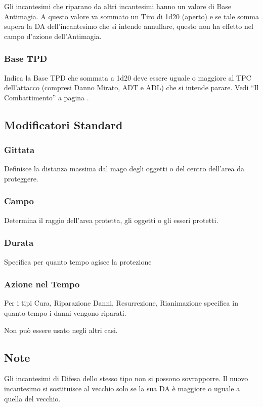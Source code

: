 Gli incantesimi che riparano da altri incantesimi hanno un valore di Base
Antimagia. A questo valore va sommato un Tiro di 1d20 (aperto) e se
tale somma supera la DA dell'incantesimo che si intende annullare,
questo non ha effetto nel campo d'azione dell'Antimagia.

\subsubsection{Base TPD}  Indica la
Base TPD che sommata a 1d20 deve essere uguale o maggiore al TPC
dell'attacco (compresi Danno Mirato, ADT e ADL) che si intende parare.
Vedi ``Il Combattimento'' a pagina \pageref{combattimento}.

\subsection{Modificatori Standard} 

\subsubsection{Gittata} 
Definisce la distanza
massima dal mago degli oggetti o del centro dell'area da proteggere.

\subsubsection{Campo} Determina il raggio dell'area protetta, gli oggetti o
gli esseri protetti. 

\subsubsection{Durata} Specifica per quanto tempo agisce
la protezione

\iffullversion
\subsubsection{Azione nel Tempo} 

Per i tipi Cura, Riparazione Danni, Resurrezione, Rianimazione
specifica in quanto tempo i danni vengono riparati.

Non pu\`o essere usato negli altri casi.
\fi

\subsection{Note} Gli incantesimi di Difesa dello stesso tipo
non si possono sovrapporre.  Il nuovo incantesimo si sostituisce al
vecchio solo se la sua DA \`e maggiore o uguale a quella del
vecchio.

